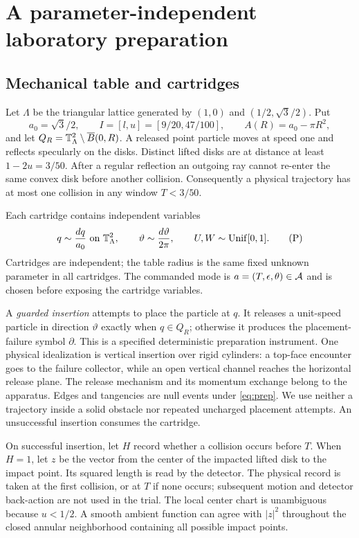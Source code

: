 \section{A parameter-independent laboratory preparation}\label{sec:lab}
\subsection{Mechanical table and cartridges}
Let $\Lambda$ be the triangular lattice generated by $(1,0)$ and
$(1/2,\sqrt3/2)$. Put
\[
 a_0=\sqrt3/2,\qquad I=[l,u]=[9/20,47/100],\qquad
 A(R)=a_0-\pi R^2,
\]
and let $Q_R=\mathbb T_\Lambda^2\setminus\overline B(0,R)$. A released point
particle moves at speed one and reflects specularly on the disks. Distinct
lifted disks are at distance at least $1-2u=3/50$. After a regular reflection
an outgoing ray cannot re-enter the same convex disk before another
collision. Consequently a physical trajectory has at most one collision
in any window $T<3/50$.

Each cartridge contains independent variables
\begin{equation}
 q\sim\frac{dq}{a_0}\text{ on }\mathbb T_\Lambda^2,\qquad
 \vartheta\sim\frac{d\vartheta}{2\pi},\qquad U,W\sim\mathrm{Unif}[0,1].
 \tag{P}\label{eq:prep}
\end{equation}
Cartridges are independent; the table radius is the same fixed unknown
parameter in all cartridges. The commanded mode is $a=(T,\epsilon,\theta)
\in\mathcal A$ and is chosen before exposing the cartridge variables.

A \emph{guarded insertion} attempts to place the particle at $q$. It releases
a unit-speed particle in direction $\vartheta$ exactly when $q\in Q_R$;
otherwise it produces the placement-failure symbol $\partial$. This is a
specified deterministic preparation instrument. One physical idealization is
vertical insertion over rigid cylinders: a top-face encounter goes to the
failure collector, while an open vertical channel reaches the horizontal
release plane. The release mechanism and its momentum exchange belong to
the apparatus. Edges and tangencies are null events under \eqref{eq:prep}.
We use neither a trajectory inside a solid obstacle nor repeated uncharged
placement attempts. An unsuccessful insertion consumes the cartridge.

On successful insertion, let $H$ record whether a collision occurs before
$T$. When $H=1$, let $z$ be the vector from the center of the impacted lifted
disk to the impact point. Its squared length is read by the detector. The
physical record is taken at the first collision, or at $T$ if none occurs;
subsequent motion and detector back-action are not used in the trial. The
local center chart is unambiguous because $u<1/2$. A smooth ambient function
can agree with $|z|^2$ throughout the closed annular neighborhood containing
all possible impact points.

